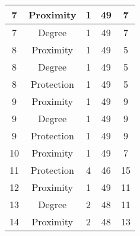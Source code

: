 \documentclass[results.tex]{subfiles}
\begin{document}
\begin{center}
\begin{tabular}{| c || c | c | c | c |}
            \hline
            7                       & Proximity                    & 1                      & 49                      & 7                    \\
            \hline
            7                       & Degree                       & 1                      & 49                      & 7                    \\
            \hline
            8                       & Proximity                    & 1                      & 49                      & 5                    \\
            \hline
            8                       & Degree                       & 1                      & 49                      & 5                    \\
            \hline
            8                       & Protection                   & 1                      & 49                      & 5                    \\
            \hline
            9                       & Proximity                    & 1                      & 49                      & 9                    \\
            \hline
            9                       & Degree                       & 1                      & 49                      & 9                    \\
            \hline
            9                       & Protection                   & 1                      & 49                      & 9                    \\
            \hline
            10                      & Proximity                    & 1                      & 49                      & 7                    \\
            \hline
            11                      & Protection                   & 4                      & 46                      & 15                   \\
            \hline
            12                      & Proximity                    & 1                      & 49                      & 11                   \\
            \hline
            13                      & Degree                       & 2                      & 48                      & 11                   \\
            \hline
            14                      & Proximity                    & 2                      & 48                      & 13                   \\

\end{tabular}
\end{center}
\end{document}
